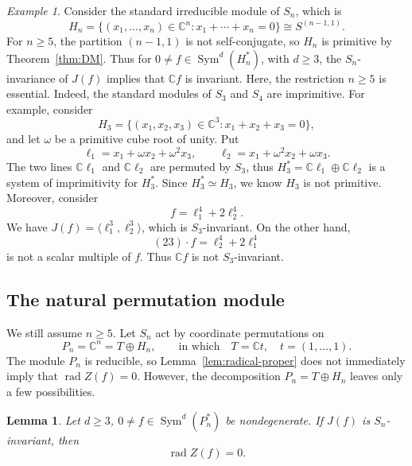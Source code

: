 \documentclass[11pt,reqno]{amsart}
\numberwithin{equation}{section}
\newtheorem{lemma}[theorem]{Lemma}
\theoremstyle{definition}
\theoremstyle{remark}
\newtheorem{example}[theorem]{Example}
\newcommand{\C}{\mathbb C}
\newcommand{\Sym}{\operatorname{Sym}}
\newcommand{\rad}{\operatorname{rad}}
\begin{document}
\begin{example}\label{cor:standard}
Consider the standard irreducible module of $S_n$, which is
\[
  H_n
  =
  \{(x_1,\ldots,x_n)\in\C^n:
    x_1+\cdots+x_n=0\}
  \cong
  S^{(n-1,1)}.
\]
For $n\geq5$, the partition $(n-1,1)$ is not self-conjugate, so
$H_n$ is primitive by Theorem~\ref{thm:DM}.   Thus for $0\ne f\in\Sym^d(H_n^*)$, with $d\geq 3$, the $S_n$-invariance of $J(f)$ implies that $\C f$ is invariant. Here, the restriction $n\geq5$ is essential.  Indeed, the standard modules of $S_3$ and $S_4$ are imprimitive. For example, consider
\[
  H_3=\{(x_1,x_2,x_3)\in\C^3:x_1+x_2+x_3=0\},
\]
and let $\omega$ be a primitive cube root of unity.  Put
\[
  \ell_1=x_1+\omega x_2+\omega^2x_3,
  \qquad
  \ell_2=x_1+\omega^2x_2+\omega x_3.
\]
The two lines $\C\ell_1$ and $\C\ell_2$ are permuted by $S_3$, thus $H_3^*=\C\ell_1\oplus \C\ell_2$ is a system of imprimitivity for
$H_3^*$. Since $H^*_3\simeq H_3$, we know $H_3$ is not primitive.  Moreover, consider
\[
  f=\ell_1^4+2\ell_2^4.
\]
We have $J(f)=\langle \ell_1^3,\ell_2^3\rangle$, which is $S_3$-invariant.  On the other hand,
\[
  (23)\cdot f=\ell_2^4+2\ell_1^4
\]
is not a scalar multiple of $f$.  Thus $\C f$ is not
$S_3$-invariant.
\end{example}


\subsection{The natural permutation module}
\label{sec:permutation}

We still assume $n\geq 5$. Let $S_n$ act by coordinate permutations on
\begin{equation}\label{eq:naturalrepsn}
  P_n=\C^n=T\oplus H_n,
  \qquad
  \text{in which}\quad T=\C t,\quad t=(1,\ldots,1).
\end{equation}
The module $P_n$ is reducible, so Lemma~\ref{lem:radical-proper} does not
immediately imply that $\rad Z(f)=0$.  However, the decomposition $P_n=T\oplus H_n$ leaves only a few possibilities.

\begin{lemma}\label{lem:permutation-radical}
Let $d\geq3$, 
$0\ne f\in\Sym^d(P_n^*)$ be nondegenerate.  If $J(f)$ is
$S_n$-invariant, then
\[
  \rad Z(f)=0.
\]
\end{lemma}
\end{document}
